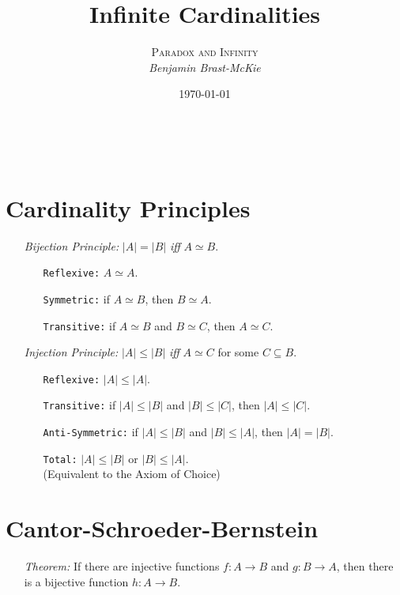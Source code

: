 \documentclass[a4paper, 11pt]{article} %
\title{\textbf{Infinite Cardinalities}} %
\author{\textsc{Paradox and Infinity}\\ \em Benjamin Brast-McKie} %
\date{\today} %
\makeatletter
\newcommand{\abs}[1]{|#1|} %
\renewcommand{\maketitle}{ %
\begin{flushright} %
{\LARGE\@title} %

\vspace{10pt} %

{\@author} %
\\\@date %

\vspace{-10pt} %
\end{flushright}
}
\makeatother
\begin{document}
\maketitle %

\thispagestyle{empty}



\section*{Cardinality Principles}

\begin{enumerate}
  \item[\it Bijection Principle:] $\abs{A}=\abs{B}$ \textit{iff} $A\simeq B$. 
    \begin{itemize}
      \item[\tt Reflexive:] $A \simeq A$.
      \item[\tt Symmetric:] if $A \simeq B$, then $B \simeq A$.
      \item[\tt Transitive:] if $A \simeq B$ and $B \simeq C$, then $A \simeq C$.
    \end{itemize}
  \item[\it Injection Principle:] $\abs{A} \leq \abs{B}$ \textit{iff} $A \simeq C$ for some $C\subseteq B$. 
    \begin{itemize}
      \item[\tt Reflexive:] $|A| \leq |A|$.
      \item[\tt Transitive:] if $|A| \leq |B|$ and $|B| \leq |C|$, then $|A| \leq |C|$.
      \item[\tt Anti-Symmetric:] if $|A| \leq |B|$ and $|B| \leq |A|$, then $|A| = |B|$.
      \item[\tt Total:] $|A| \leq |B|$ or $|B| \leq |A|$.\\
        (Equivalent to the Axiom of Choice)
    \end{itemize}
\end{enumerate}



\section*{Cantor-Schroeder-Bernstein}

\begin{enumerate}
  \item[\it Theorem:] If there are injective functions $f: A \to B$ and $g: B \to A$, then there is a bijective function $h: A \to B$.
\end{enumerate}
\end{document}
